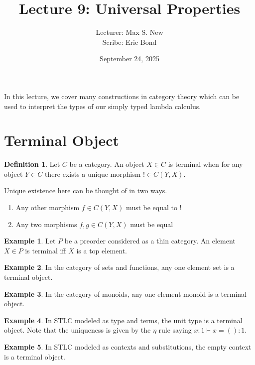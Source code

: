 \documentclass[12pt]{article}
\theoremstyle{definition}
\newtheorem{example}{Example}[section]
\newtheorem{definition}{Definition}[section]
\begin{document}
\title{Lecture 9: Universal Properties}
\author{Lecturer:  Max S. New\\ Scribe: Eric Bond}
\date{September 24, 2025}
\maketitle

In this lecture, we cover many constructions in category theory which can be used to interpret the types of our simply typed lambda calculus. 
\section{Terminal Object}
\begin{definition}
Let $C$ be a category. An object $X \in C$ is terminal when for any object $Y\in C$ there exists a unique morphism $! \in C(Y,X)$.
\end{definition}

Unique existence here can be thought of in two ways. 
\begin{enumerate}
    \item Any other morphism $f \in C(Y,X)$ must be equal to $!$
    \item Any two morphisms $f,g \in C(Y,X)$ must be equal 
\end{enumerate}

\begin{example}Let $P$ be a preorder considered as a thin category. An element $X\in P$ is terminal iff $X$ is a top element.
\end{example}

\begin{example} In the category of sets and functions, any one element set is a terminal object.
\end{example}
\begin{example} In the category of monoids, any one element monoid is a terminal object.
\end{example}

\begin{example} In STLC modeled as type and terms, the unit type is a terminal object. Note that the uniqueness is given by the $\eta$ rule saying $x : 1 \vdash x = () : 1$. 
\end{example}

\begin{example} In STLC modeled as contexts and substitutions, the empty context is a terminal object.
\end{example}
\end{document}
